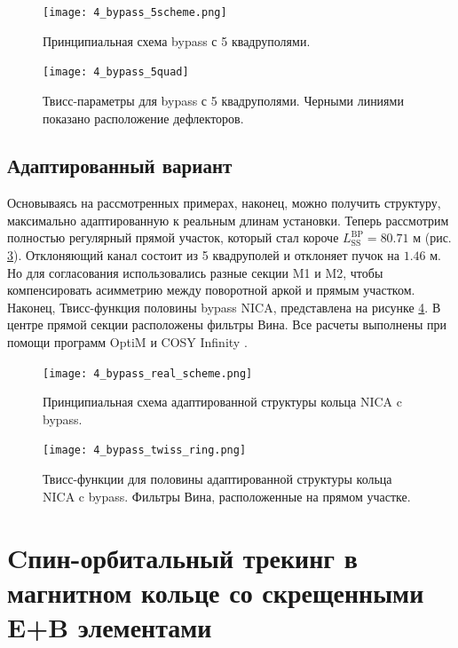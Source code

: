 \begin{figure}[!h]
  \centering
   \texttt{[image: 4\_bypass\_5scheme.png]}
   \caption{Принципиальная схема bypass с 5 квадруполями.}
   \label{fig:4_bypass_5scheme}
\end{figure}

\begin{figure}[!h]
  \centering
   \texttt{[image: 4\_bypass\_5quad]}
   \caption{Твисс-параметры для bypass с 5 квадруполями. Черными линиями показано расположение дефлекторов.}
   \label{fig:4_bypass_5quad}
\end{figure}

	\subsection{Адаптированный вариант}\label{sec:EDM/Wien_filter/ByPass/final}

\par Основываясь на рассмотренных примерах, наконец, можно получить структуру, максимально адаптированную к реальным длинам установки. Теперь рассмотрим полностью регулярный прямой участок, который стал короче $L_{\textrm{SS}}^{\textrm{BP}}=80.71$ м (рис. \ref{fig:4_bypass_real_scheme}). Отклоняющий канал состоит из 5 квадруполей и отклоняет пучок на $1.46$ м. Но для согласования использовались разные секции M1 и M2, чтобы компенсировать асимметрию между поворотной аркой и прямым участком. Наконец, Твисс-функция половины bypass NICA, представлена на рисунке \ref{fig:4_bypass_twiss_ring}. В центре прямой секции расположены фильтры Вина. Все расчеты выполнены при помощи программ OptiM \cite{optim} и COSY Infinity \cite{cosy}.

\begin{figure}[!h]
  \centering
   \texttt{[image: 4\_bypass\_real\_scheme.png]}
   \caption{Принципиальная схема адаптированной структуры кольца NICA c bypass.}
   \label{fig:4_bypass_real_scheme}
\end{figure}

\begin{figure}[!h]
  \centering
   \texttt{[image: 4\_bypass\_twiss\_ring.png]}
   \caption{Твисс-функции для половины адаптированной структуры кольца NICA c bypass. Фильтры Вина, расположенные на прямом участке.}
   \label{fig:4_bypass_twiss_ring}
\end{figure}

\newpage
	
	\section{Cпин-орбитальный трекинг в магнитном кольце со скрещенными E+B элементами} \label{sec:EDM/Wien_filter_tracking}


